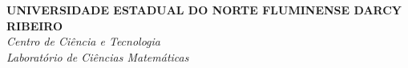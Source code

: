 \documentclass[
	12pt,				%
	oneside, %
	a4paper,			%
	english,			%
	french,				%
	spanish,			%
	brazil				%
	]{abntex2}
\begin{document}

\frenchspacing

\pretextual

\begin{center}
\large
\textbf{UNIVERSIDADE ESTADUAL DO NORTE FLUMINENSE DARCY RIBEIRO} \\
\textit{Centro de Ciência e Tecnologia\\
Laboratório de Ciências Matemáticas\\}
\end{center}
\vspace{2.5cm}

\imprimircapa

\imprimirfolhaderosto*

\end{document}
